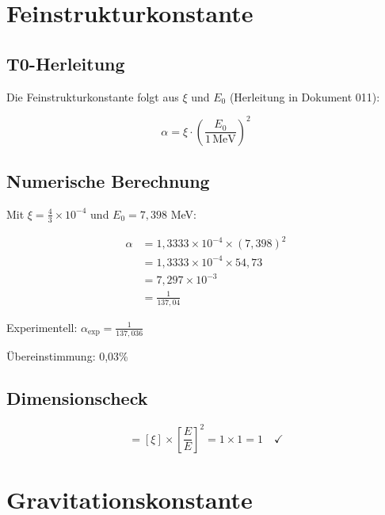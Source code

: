 	\section{Feinstrukturkonstante}
	\label{sec:fine_structure}
	
	\subsection{T0-Herleitung}
	
	Die Feinstrukturkonstante folgt aus $\xi$ und $E_0$ (Herleitung in Dokument 011):
	
	\begin{equation}
		\boxed{\alpha = \xi \cdot \left(\frac{E_0}{1\,\text{MeV}}\right)^2}
		\label{eq:alpha_derivation}
	\end{equation}
	
	\subsection{Numerische Berechnung}
	
	Mit $\xi = \frac{4}{3} \times 10^{-4}$ und $E_0 = 7{,}398$ MeV:
	
	\begin{align}
		\alpha &= 1{,}3333 \times 10^{-4} \times (7{,}398)^2 \\
		&= 1{,}3333 \times 10^{-4} \times 54{,}73 \\
		&= 7{,}297 \times 10^{-3} \\
		&= \frac{1}{137{,}04}
	\end{align}
	
	Experimentell: $\alpha_{\text{exp}} = \frac{1}{137{,}036}$
	
	Übereinstimmung: 0,03\%
	
	\subsection{Dimensionscheck}
	
	\begin{equation}
		[\alpha] = [\xi] \times \left[\frac{E}{E}\right]^2 = 1 \times 1 = 1 \quad \checkmark
	\end{equation}
	
	\section{Gravitationskonstante}
	\label{sec:gravitational_constant}
	
